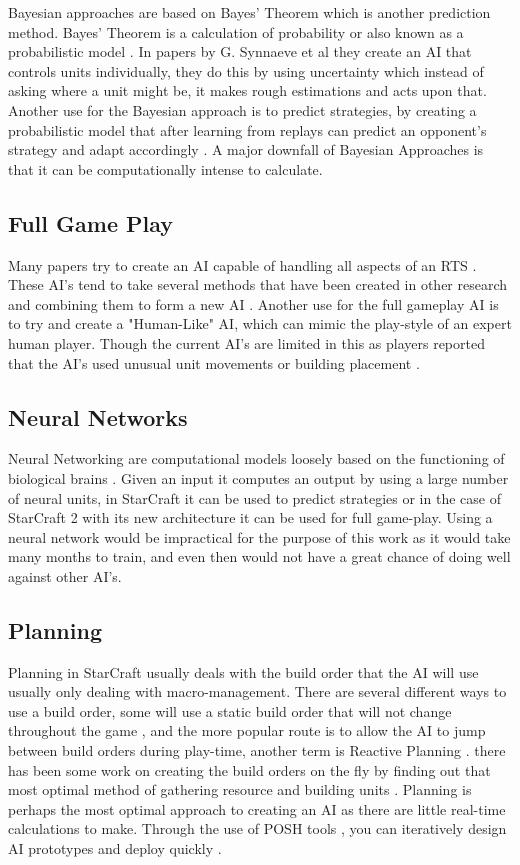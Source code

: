 \documentclass[journal]{IEEEtran}
\begin{document}
Bayesian approaches are based on Bayes' Theorem which is another prediction method. Bayes' Theorem is a calculation of probability or also known as a probabilistic model \cite{BayesianAI}. In papers by G. Synnaeve et al \cite{UnitsControl}\cite{SpecialTactics} they create an AI that controls units individually, they do this by using uncertainty which instead of asking where a unit might be, it makes rough estimations and acts upon that. Another use for the Bayesian approach is to predict strategies, by creating a probabilistic model that after learning from replays can predict an opponent's strategy and adapt accordingly \cite{Bayesian}. A major downfall of Bayesian Approaches is that it can be computationally intense to calculate.

\subsection{Full Game Play}
Many papers try to create an AI capable of handling all aspects of an RTS \cite{Agents}\cite{Hierarchical}\cite{HumanLevel}\cite{SCAIL}. These AI's tend to take several methods that have been created in other research and combining them to form a new AI \cite{Agents}. Another use for the full gameplay AI is to try and create a "Human-Like" AI, which can mimic the play-style of an expert human player. Though the current AI's are limited in this as players reported that the AI's used unusual unit movements or building placement \cite{EvalHuman}.

\subsection{Neural Networks}
Neural Networking are computational models loosely based on the functioning of biological brains \cite{Deep}. Given an input it computes an output by using a large number of neural units, in StarCraft it can be used to predict strategies or in the case of StarCraft 2 with its new architecture it can be used for full game-play. Using a neural network would be impractical for the purpose of this work as it would take many months to train, and even then would not have a great chance of doing well against other AI's.

\subsection{Planning}
Planning in StarCraft usually deals with the build order that the AI will use usually only dealing with macro-management. There are several different ways to use a build order, some will use a static build order that will not change throughout the game \cite{Swen}, and the more popular route is to allow the AI to jump between build orders during play-time, another term is Reactive Planning \cite{Fuzzy}\cite{OnlineEvo}\cite{GoalDriven}. there has been some work on creating the build orders on the fly by finding out that most optimal method of gathering resource and building units \cite{BuildOrder}. Planning is perhaps the most optimal approach to creating an AI as there are little real-time calculations to make. Through the use of POSH tools \cite{POSH}, you can iteratively design AI prototypes and deploy quickly \cite{Swen}. 
\end{document}
